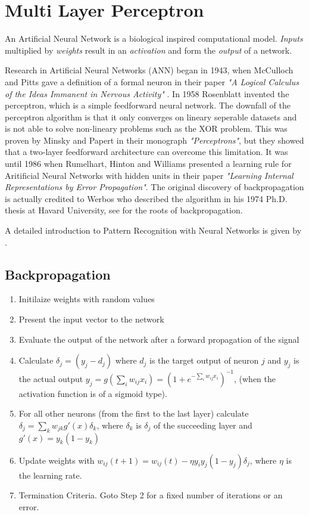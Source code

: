 \section{Multi Layer Perceptron}
An Artificial Neural Network is a biological inspired computational model. \textit{Inputs} multiplied by \textit{weights} result in an \textit{activation} and form the \textit{output} of a network.

Research in Artificial Neural Networks (ANN) began in 1943, when McCulloch and Pitts gave a definition of a formal neuron in their paper \textit{"A Logical Calculus of the Ideas Immanent in Nervous Activity"} \cite{culloch1943}. In 1958 Rosenblatt invented the perceptron, which is a simple feedforward neural network. The downfall of the perceptron algorithm is that it only converges on lineary seperable datasets and is not able to solve non-lineary problems such as the XOR problem. This was proven by Minsky and Papert in their monograph \textit{"Perceptrons"}, but they showed that a two-layer feedforward architecture can overcome this limitation. It was until 1986 when Rumelhart, Hinton and Williams presented a learning rule for Aritificial Neural Networks with hidden units in their paper \textit{"Learning Internal Representations by Error Propagation"}. The original discovery of backpropagation is actually credited to Werbos who described the algorithm in his 1974 Ph.D. thesis at Havard University, see \cite{werbos1994} for the roots of backpropagation.

A detailed introduction to Pattern Recognition with Neural Networks is given by \cite{Bishop95}.

\subsection{Backpropagation}

\begin{enumerate}
 \item Initilaize weights with random values
 \item Present the input vector to the network
 \item Evaluate the output of the network after a forward propagation of the signal
 \item Calculate $\delta_j = (y_j - d_j)$ where $d_j$ is the target output of neuron $j$ and $y_j$ is the actual output $y_j = g(\sum_i{ w_{ij}x_i}) = (1 + e^{-\sum_i{w_{ij}x_i}})^{-1}$, (when the activation function is of a sigmoid type).
\item For all other neurons (from the first to the last layer) calculate $\delta_j = \sum_k{w_{jk} g'(x)\delta_k}$, where  $\delta_k$ is $\delta_j$ of the succeeding layer and $g'(x) = y_k(1-y_k)$
\item Update weights with $w_{ij}(t+1) = w_{ij}(t) - \eta y_i y_j(1-y_j) \delta_j$, where $\eta$ is the learning rate.
\item Termination Criteria. Goto Step 2 for a fixed number of iterations or an error.
\end{enumerate}

